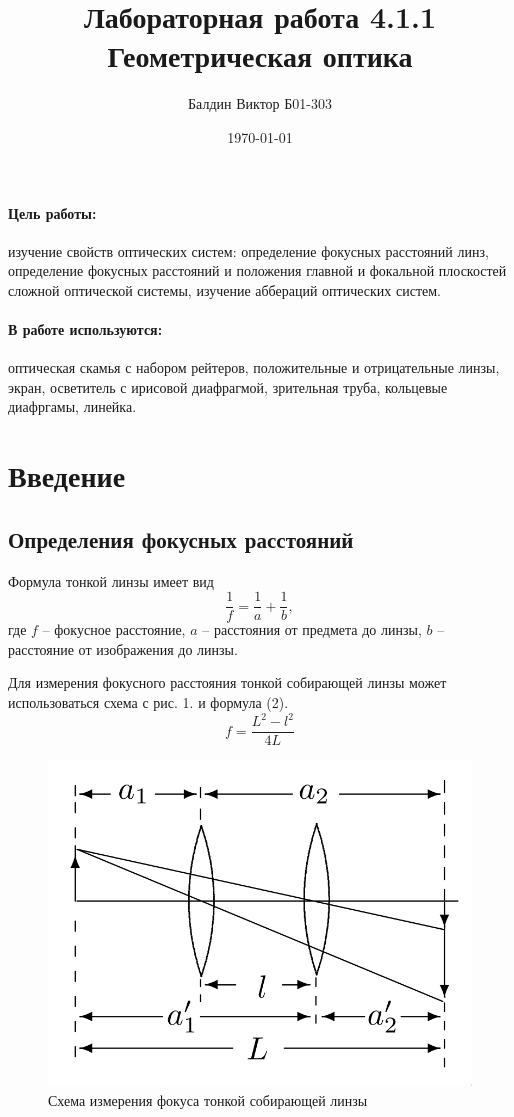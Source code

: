 \documentclass[a4paper,12pt]{article}
\author{Балдин Виктор Б01-303}
\title{Лабораторная работа 4.1.1 \\
	\textbf{Геометрическая оптика}}
\date{\today}
\theoremstyle{definition}
\begin{document}
{\Large \maketitle}

	\paragraph*{Цель работы:} изучение свойств оптических систем: определение фокусных расстояний линз, определение фокусных расстояний и положения главной и фокальной плоскостей сложной оптической системы, изучение аббераций оптических систем.

	\paragraph*{В работе используются:} оптическая скамья с набором рейтеров, положительные и отрицательные линзы, экран, осветитель с ирисовой диафрагмой, зрительная труба, кольцевые диафргамы, линейка.

\section{Введение}
\subsection*{Определения фокусных расстояний}
Формула тонкой линзы имеет вид
\begin{equation}
    \frac{1}{f} = \frac{1}{a} + \frac{1}{b},
\end{equation}
\noindent
где $f$ -- фокусное расстояние, $a$ -- расстояния от предмета до линзы, $b$ -- расстояние от изображения до линзы.

\noindent
Для измерения фокусного расстояния тонкой собирающей линзы может использоваться схема с рис. 1. и формула (2).
\begin{equation}
    f = \frac{L^2 - l^2}{4L}
\end{equation}

\begin{figure}[H]
    \centering
    \includegraphics[scale=0.3]{pic_1.png}
    \caption{Схема измерения фокуса тонкой собирающей линзы}
\end{figure}
\end{document}

